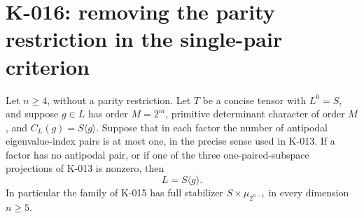 \section{K-016: removing the parity restriction in the single-pair criterion}

\begin{theorem}[K-016]
Let $n\ge4$, without a parity restriction.  Let $T$ be a concise
tensor with $L^0=S$, and suppose $g\in L$ has order $M=2^m$,
primitive determinant character of order $M$, and
$C_L(g)=S\langle g\rangle$.  Suppose that in each factor the
number of antipodal eigenvalue-index pairs is at most one, in the
precise sense used in K-013.  If a factor has no antipodal pair, or
if one of the three one-paired-subspace projections of K-013 is
nonzero, then
\[
                         L=S\langle g\rangle.
\]
In particular the family of K-015 has full stabilizer
$S\times\mu_{2^{n-1}}$ in every dimension $n\ge5$.
\end{theorem}

